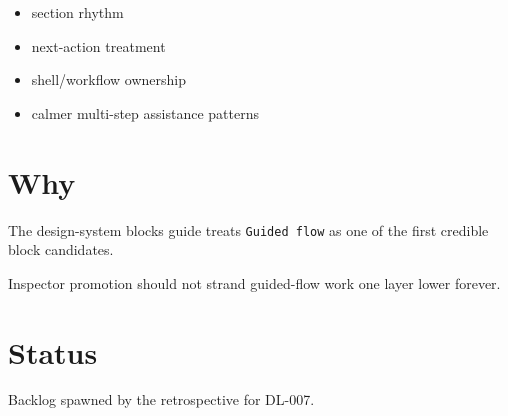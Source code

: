 \begin{itemize}
\tightlist
\item
  section rhythm
\item
  next-action treatment
\item
  shell/workflow ownership
\item
  calmer multi-step assistance patterns
\end{itemize}

\section{Why}\label{record-301-why}

The design-system blocks guide treats \texttt{G\allowbreak{}u\allowbreak{}i\allowbreak{}d\allowbreak{}e\allowbreak{}d\allowbreak{} \allowbreak{}f\allowbreak{}l\allowbreak{}o\allowbreak{}w} as one of the first credible block candidates.

Inspector promotion should not strand guided-flow work one layer lower forever.

\section{Status}\label{record-301-status}

Backlog spawned by the retrospective for DL-007.

